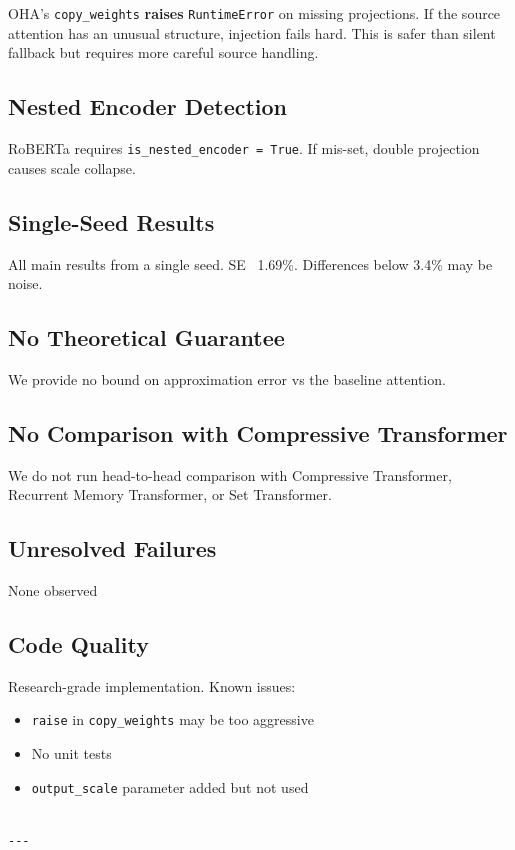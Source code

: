 OHA's \texttt{copy\_weights} \textbf{raises} \texttt{RuntimeError} on missing projections. If 
the source attention has an unusual structure, injection fails hard. This 
is safer than silent fallback but requires more careful source handling.

\subsection{Nested Encoder Detection}

RoBERTa requires \texttt{is\_nested\_encoder = True}. If mis-set, double projection 
causes scale collapse.

\subsection{Single-Seed Results}

All main results from a single seed. SE ~1.69\%. Differences below 3.4\% 
may be noise.

\subsection{No Theoretical Guarantee}

We provide no bound on approximation error vs the baseline attention.

\subsection{No Comparison with Compressive Transformer}

We do not run head-to-head comparison with Compressive Transformer, 
Recurrent Memory Transformer, or Set Transformer.

\subsection{Unresolved Failures}

None observed

\subsection{Code Quality}

Research-grade implementation. Known issues:

\begin{itemize}
\item \texttt{raise} in \texttt{copy\_weights} may be too aggressive
\item No unit tests
\item \texttt{output\_scale} parameter added but not used
\end{itemize}
\begin{lstlisting}

---
\end{lstlisting}
